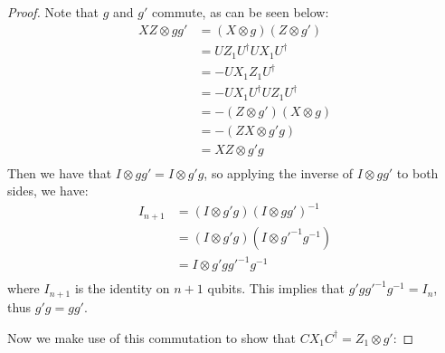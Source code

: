 \documentclass[12pt]{dalthesis}
\begin{document}
\begin{proof}
Note that $g$ and $g'$ commute, as can be seen below:
\begin{align}
XZ \otimes gg' &= (X \otimes g)(Z \otimes g') \\
 &= UZ_1U^{\dag}UX_1U^{\dag} \\ 
 &= -UX_1Z_1U^\dag \\
 &= -UX_1U^\dag UZ_1U^\dag \\ 
 &= -(Z \otimes g')(X \otimes g) \\
 &= -(ZX \otimes g'g) \\
 &= XZ \otimes g'g \\
\end{align}
Then we have that $I \otimes gg' = I \otimes g'g$, so applying the inverse of $I \otimes gg'$ to both sides, we have:
\begin{align}
I_{n+1} &= (I \otimes g'g)(I \otimes gg')^{-1} \\
 &= (I \otimes g'g)(I \otimes g'^{-1}g^{-1}) \\ 
 &= I \otimes g'gg'^{-1}g^{-1} \\
\end{align}
where $I_{n+1}$ is the identity on $n+1$ qubits. This implies that $g'gg'^{-1}g^{-1} = I_n$, thus $g'g = gg'$.

Now we make use of this commutation to show that $CX_1C^\dag = Z_1 \otimes g'$:



\end{proof}
\end{document}
